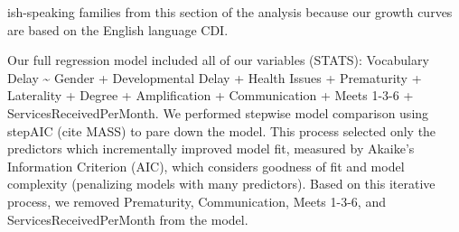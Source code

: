 \documentclass[english,man]{apa6}
\begin{document}
ish-speaking families from this section of the analysis because our growth curves are based on the English language CDI.

Our full regression model included all of our variables (STATS): Vocabulary Delay \textasciitilde{} Gender + Developmental Delay + Health Issues + Prematurity + Laterality + Degree + Amplification + Communication + Meets 1-3-6 + ServicesReceivedPerMonth. We performed stepwise model comparison using stepAIC (cite MASS) to pare down the model. This process selected only the predictors which incrementally improved model fit, measured by Akaike's Information Criterion (AIC), which considers goodness of fit and model complexity (penalizing models with many predictors). Based on this iterative process, we removed Prematurity, Communication, Meets 1-3-6, and ServicesReceivedPerMonth from the model.
\end{document}
